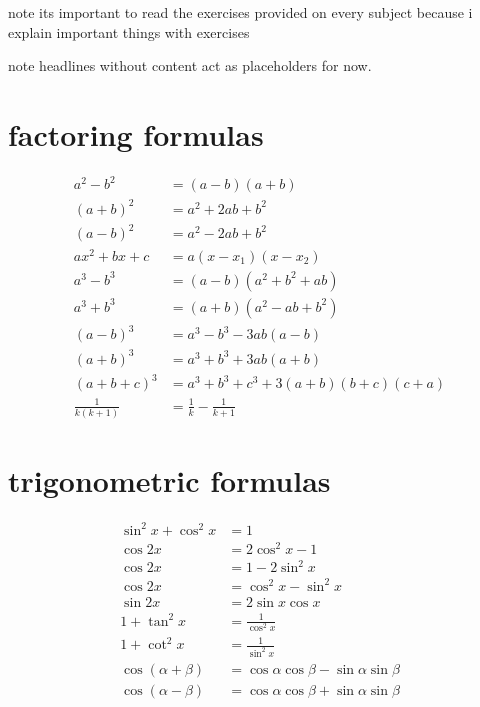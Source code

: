 \documentclass[a4paper,12pt]{article}
\newcommand{\?}{\stackrel{?}{=}}
\begin{document}
\newenvironment{note}
  {\begin{bclogo}[logo=\bcinfo, couleurBarre=orange, couleur=lightgray]{ note}}
  {\end{bclogo}}
\newenvironment{attention}
  {\begin{bclogo}[logo=\bcattention, couleurBarre=red, noborder=true, 
                couleur=red!15]{Important!}}
  {\end{bclogo}}

\begin{note}
its important to read the exercises provided on every subject because i explain important things with exercises\\[0pt]
\end{note}
\begin{note}
headlines without content act as placeholders for now.\\[0pt]
\end{note}
\section{factoring formulas}
\label{sec:org2393718}
\begin{align}
  a^2-b^2 &= (a-b)(a+b)\\
  (a+b)^2 &= a^2+2ab+b^2\\
  (a-b)^2 &= a^2-2ab+b^2\\
  ax^2+bx+c &= a(x-x_1)(x-x_2)\\
  a^3-b^3 &= (a-b)(a^2+b^2+ab)\\
  a^3+b^3 &= (a+b)(a^2-ab+b^2)\\
  (a-b)^3 &= a^3-b^3-3ab(a-b)\\
  (a+b)^3 &= a^3+b^3+3ab(a+b)\\
  (a+b+c)^3 &= a^3+b^3+c^3+3(a+b)(b+c)(c+a)\\
  \frac{1}{k(k+1)} &= \frac1k - \frac{1}{k+1}
\end{align}
\section{trigonometric formulas}
\label{sec:org8f6e426}
\begin{align}
  \sin^2{x} + \cos^2{x} &= 1\\
  \cos 2x &= 2\cos^2 x - 1\\
  \cos 2x &= 1 - 2\sin^2 x\\
  \cos 2x &= \cos^2 x - \sin^2 x\\
  \sin 2x &= 2\sin x \cos x\\
  1 + \tan^2 x &= \frac{1}{\cos^2 x}\\
  1 + \cot^2 x &= \frac{1}{\sin^2 x}\\
  \cos(\alpha+\beta) &= \cos\alpha\cos\beta-\sin\alpha\sin\beta\\
  \cos(\alpha-\beta) &= \cos\alpha\cos\beta+\sin\alpha\sin\beta
\end{align}
\end{document}
